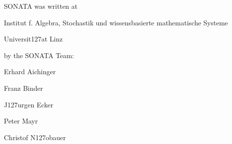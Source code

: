 %
%

SONATA was written at
\begingroup
\smallskip \parindent3pc \parskip 0pt
\item{} Institut f. Algebra, Stochastik und wissensbasierte mathematische
        Systeme
\item{} Universit\accent127at Linz
\endgroup

by the SONATA Team:

\begingroup
\smallskip \parindent3pc \parskip 0pt
\item{} Erhard Aichinger
\item{} Franz Binder
\item{} J\accent127urgen Ecker
\item{} Peter Mayr
\item{} Christof N\accent127obauer
\endgroup



